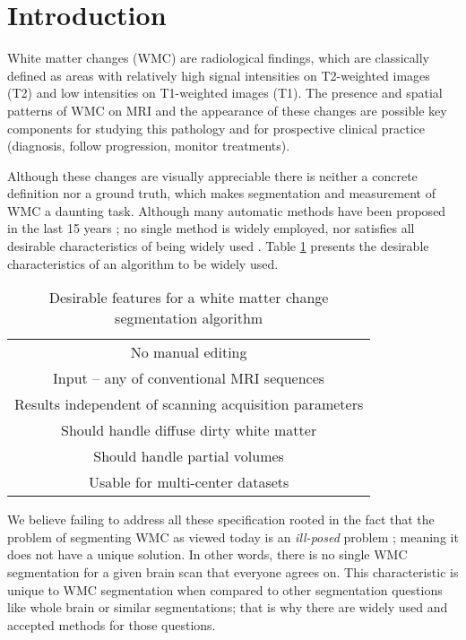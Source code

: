 \section{Introduction} \label{intro}


White matter changes (WMC) are radiological findings, which are classically defined as areas with relatively high signal intensities on T2-weighted images (T2) and low intensities on T1-weighted images (T1). The presence and spatial patterns of WMC on MRI and the appearance of these changes are possible key components for studying this pathology and for prospective clinical practice (diagnosis, follow progression, monitor treatments).

Although these changes are visually appreciable there is neither a concrete definition nor a ground truth, which makes segmentation and measurement of WMC a daunting task. Although many automatic methods have been proposed in the last 15 years \cite{LesionSegmentationToolbox,LesionTOADS,OutlierLocalIntensity,kNN-TTPs}; no single method is widely employed, nor satisfies all desirable characteristics of being widely used \cite{GarciaReview}. Table \ref{Table:Requirements} presents the desirable characteristics of an algorithm to be widely used.

\begin{table}
\centering
    \begin{tabular}  {  c }
    \hline
        No manual editing \\ 
        Input – any of conventional MRI sequences \\ 
        Results independent of scanning acquisition parameters \\ 
        Should handle diffuse dirty white matter \\ 
        Should handle partial volumes \\ 
        Usable for multi-center datasets \\
    \hline
    \end{tabular} 
    \caption{Desirable features for a white matter change segmentation algorithm } 
    \label{Table:Requirements}
\end{table}
    
We believe failing to address all these specification rooted in the fact that the problem of segmenting WMC as viewed today is an \textit{ill-posed} problem \cite{IllPosed}; meaning it does not have a unique solution. In other words, there is no single WMC segmentation for a given brain scan that everyone agrees on. This characteristic is unique to WMC segmentation when compared to other segmentation questions like whole brain or similar segmentations; that is why there are widely used and accepted methods for those questions.

